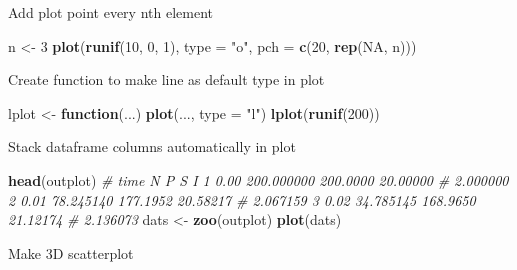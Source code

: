 \documentclass[10,portrait]{article}
\newenvironment{Shaded}{\begin{snugshade}}{\end{snugshade}}
\newcommand{\KeywordTok}[1]{\textcolor[rgb]{0.13,0.29,0.53}{\textbf{#1}}}
\newcommand{\DataTypeTok}[1]{\textcolor[rgb]{0.13,0.29,0.53}{#1}}
\newcommand{\DecValTok}[1]{\textcolor[rgb]{0.00,0.00,0.81}{#1}}
\newcommand{\StringTok}[1]{\textcolor[rgb]{0.31,0.60,0.02}{#1}}
\newcommand{\CommentTok}[1]{\textcolor[rgb]{0.56,0.35,0.01}{\textit{#1}}}
\newcommand{\OtherTok}[1]{\textcolor[rgb]{0.56,0.35,0.01}{#1}}
\newcommand{\ControlFlowTok}[1]{\textcolor[rgb]{0.13,0.29,0.53}{\textbf{#1}}}
\newcommand{\NormalTok}[1]{#1}
\begin{document}
Add plot point every nth element

\begin{Shaded}
\begin{Highlighting}[]
\NormalTok{n <-}\StringTok{ }\DecValTok{3}
\KeywordTok{plot}\NormalTok{(}\KeywordTok{runif}\NormalTok{(}\DecValTok{10}\NormalTok{, }\DecValTok{0}\NormalTok{, }\DecValTok{1}\NormalTok{), }\DataTypeTok{type =} \StringTok{"o"}\NormalTok{, }\DataTypeTok{pch =} \KeywordTok{c}\NormalTok{(}\DecValTok{20}\NormalTok{, }\KeywordTok{rep}\NormalTok{(}\OtherTok{NA}\NormalTok{, }
\NormalTok{    n)))}
\end{Highlighting}
\end{Shaded}

Create function to make line as default type in plot

\begin{Shaded}
\begin{Highlighting}[]
\NormalTok{lplot <-}\StringTok{ }\ControlFlowTok{function}\NormalTok{(...) }\KeywordTok{plot}\NormalTok{(..., }\DataTypeTok{type =} \StringTok{"l"}\NormalTok{)}
\KeywordTok{lplot}\NormalTok{(}\KeywordTok{runif}\NormalTok{(}\DecValTok{200}\NormalTok{))}
\end{Highlighting}
\end{Shaded}

Stack dataframe columns automatically in plot

\begin{Shaded}
\begin{Highlighting}[]
\KeywordTok{head}\NormalTok{(outplot)}
\CommentTok{# time N P S I 1 0.00 200.000000 200.0000 20.00000}
\CommentTok{# 2.000000 2 0.01 78.245140 177.1952 20.58217}
\CommentTok{# 2.067159 3 0.02 34.785145 168.9650 21.12174}
\CommentTok{# 2.136073}
\NormalTok{dats <-}\StringTok{ }\KeywordTok{zoo}\NormalTok{(outplot)}
\KeywordTok{plot}\NormalTok{(dats)}
\end{Highlighting}
\end{Shaded}

Make 3D scatterplot
\end{document}
